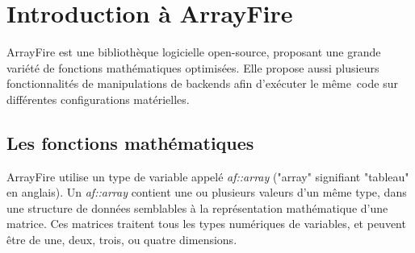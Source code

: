 \documentclass[10pt]{report}
\begin{document}
	\section{Introduction à ArrayFire}
	ArrayFire est une bibliothèque logicielle open-source, proposant une grande variété de fonctions mathématiques optimisées. Elle propose aussi plusieurs fonctionnalités de manipulations de backends afin d'exécuter le même code sur différentes configurations matérielles.
	\subsection{Les fonctions mathématiques}
	ArrayFire utilise un type de variable appelé \textit{af::array} ("array" signifiant "tableau" en anglais). Un \textit{af::array} contient une ou plusieurs valeurs d'un même type, dans une structure de données semblables à la représentation mathématique d'une matrice. Ces matrices traitent tous les types numériques de variables, et peuvent être de une, deux, trois, ou quatre dimensions. ~\par 
	
\end{document}
